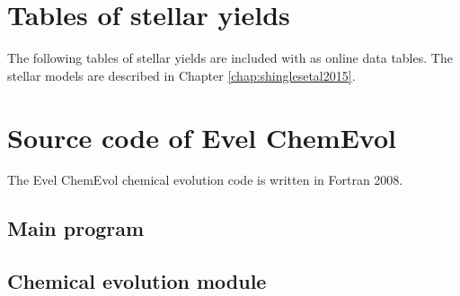 \chapter{Tables of stellar yields}\label{app:yields}
The following tables of stellar yields are included with \citet{Shingles:2015cd} as online data tables. The stellar models are described in Chapter \ref{chap:shinglesetal2015}.

{
\renewcommand\arraystretch{0.95}

}

\chapter{Source code of Evel ChemEvol}

The Evel ChemEvol chemical evolution code is written in Fortran 2008.
\section{Main program}

\section{Chemical evolution module}



